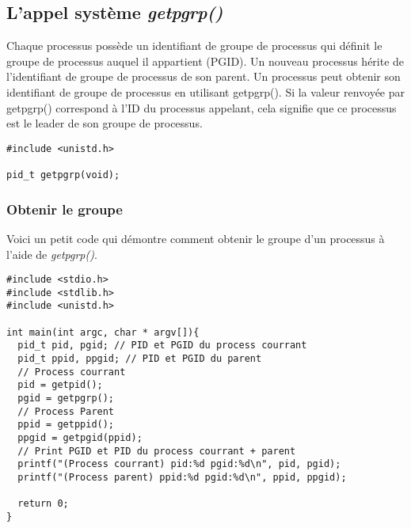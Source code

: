 \subsection{L’appel système \textit{getpgrp()} }
Chaque processus possède un identifiant de groupe de processus qui définit le groupe de processus auquel il appartient (PGID). Un nouveau processus hérite de l'identifiant de groupe de processus de son parent. Un processus peut obtenir son identifiant de groupe de processus en utilisant getpgrp(). Si la valeur renvoyée par getpgrp() correspond à l'ID du processus appelant, cela signifie que ce processus est le leader de son groupe de processus.
\newline
\begin{lstlisting}
#include <unistd.h>

pid_t getpgrp(void);
\end{lstlisting}



\subsubsection{Obtenir le groupe}

Voici un petit code qui démontre comment obtenir le groupe d'un processus à l'aide de  \textit{getpgrp()}.

\begin{lstlisting}[caption={obtenirGroupe.c}, label={obtenirGroupe.c}]
#include <stdio.h>
#include <stdlib.h>
#include <unistd.h>

int main(int argc, char * argv[]){
  pid_t pid, pgid; // PID et PGID du process courrant
  pid_t ppid, ppgid; // PID et PGID du parent
  // Process courrant
  pid = getpid();
  pgid = getpgrp();
  // Process Parent
  ppid = getppid();
  ppgid = getpgid(ppid);
  // Print PGID et PID du process courrant + parent
  printf("(Process courrant) pid:%d pgid:%d\n", pid, pgid);
  printf("(Process parent) ppid:%d pgid:%d\n", ppid, ppgid);

  return 0;
}
\end{lstlisting}

